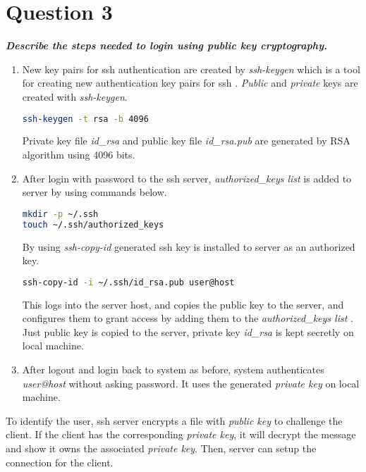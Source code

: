 \documentclass[12pt,letterpaper]{article}
\begin{document}
\newpage

\section*{Question 3}
\textbf{\textit{Describe the steps needed to login using public key cryptography.}}

\begin{enumerate}
\item New key pairs for ssh authentication are created by \textit{ssh-keygen} which is a tool for creating new authentication key pairs for ssh \cite{ssh-keygen}. \textit{Public} and \textit{private} keys are created with \textit{ssh-keygen}.
\begin{lstlisting}[language=bash]
ssh-keygen -t rsa -b 4096
\end{lstlisting}

Private key file \textit{id\_rsa} and public key file \textit{id\_rsa.pub} are generated by RSA algorithm \cite{rsa} using 4096 bits.

\item After login with password to the ssh server, \textit{authorized\_keys list} is added to server by using commands below. 
\begin{lstlisting}[language=bash]
mkdir -p ~/.ssh
touch ~/.ssh/authorized_keys
\end{lstlisting}
By using \textit{ssh-copy-id} generated ssh key is installed to server as an authorized key. 
\begin{lstlisting}[language=bash]
ssh-copy-id -i ~/.ssh/id_rsa.pub user@host
\end{lstlisting}
This logs into the server host, and copies the public key to the server, and configures them to grant access by adding them to the \textit{authorized\_keys list} \cite{ssh-copyid}. Just public key is copied to the server, private key \textit{id\_rsa} is kept secretly on local machine.

\item After logout and login back to system as before, system authenticates \textit{user@host} without asking password. It uses the generated \textit{private key} on local machine.

\end{enumerate}

To identify the user, ssh server encrypts a file with \textit{public key} to challenge the client. If the client has the corresponding \textit{private key}, it will decrypt the message and show it owns the associated \textit{private key}. Then, server can setup the connection for the client.
\end{document}
